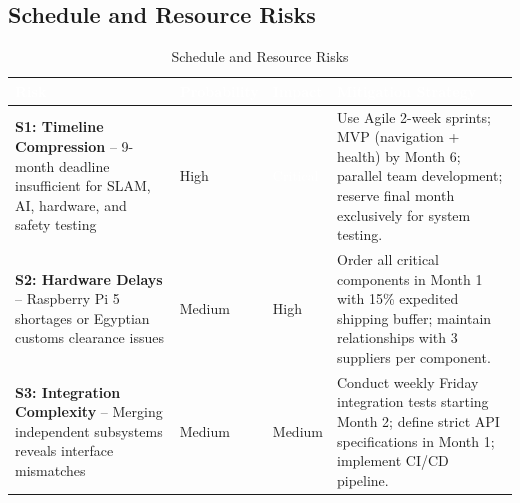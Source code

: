 \documentclass[12pt,a4paper]{report}
\renewcommand{\arraystretch}{1.45}
\renewcommand{\arraystretch}{1.3}
\begin{document}
\subsection{Schedule and Resource Risks}

\begin{table}[H]
\centering
\caption{Schedule and Resource Risks}
\label{tab:sched_risks}
{\renewcommand{\arraystretch}{2.0}
\begin{tabularx}{\textwidth}{@{}p{3cm}p{2cm}p{1.5cm}X@{}}
\toprule
\rowcolor{riskheader}
\textcolor{white}{\textbf{Risk}} & \textcolor{white}{\textbf{Probability}} & \textcolor{white}{\textbf{Impact}} & \textcolor{white}{\textbf{Mitigation Strategy}} \\
\midrule
\rowcolor{lightgray}
\textbf{S1: Timeline Compression} -- 9-month deadline insufficient for SLAM, AI, hardware, and safety testing &
\cellcolor{highpink}High & \cellcolor{criticalred}\textcolor{white}{Critical} &
Use Agile 2-week sprints; MVP (navigation + health) by Month 6; parallel team development; reserve final month exclusively for system testing. \\
\midrule
\textbf{S2: Hardware Delays} -- Raspberry Pi 5 shortages or Egyptian customs clearance issues &
\cellcolor{mediumyellow}Medium & \cellcolor{highpink}High &
Order all critical components in Month 1 with 15\% expedited shipping buffer; maintain relationships with 3 suppliers per component. \\
\midrule
\rowcolor{lightgray}
\textbf{S3: Integration Complexity} -- Merging independent subsystems reveals interface mismatches &
\cellcolor{mediumyellow}Medium & \cellcolor{mediumyellow}Medium &
Conduct weekly Friday integration tests starting Month 2; define strict API specifications in Month 1; implement CI/CD pipeline. \\
\bottomrule
\end{tabularx}}
\end{table}
\end{document}
